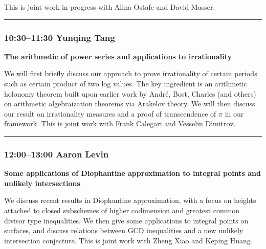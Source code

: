 \documentclass[11pt]{amsart}
\numberwithin{equation}{section}
\begin{document}
This is joint work in progress with Alina Ostafe and David Masser.

\bigskip
\hrule
\bigskip

\subsubsection*{10:30--11:30 \quad Yunqing Tang}

\textbf{The arithmetic of power series and applications to irrationality}

We will first briefly discuss our approach to prove irrationality of certain periods such as certain product of two log values. The key ingredient is an arithmetic holonomy theorem built upon earlier work by Andr\'e, Bost, Charles (and others) on arithmetic algebraization theorems via Arakelov theory. We will then discuss our result on irrationality measures and a proof of transcendence of $\pi$ in our framework. This is joint work with Frank Calegari and Vesselin Dimitrov.

\bigskip
\hrule
\bigskip

\subsubsection*{12:00--13:00 \quad Aaron Levin}


\textbf{Some applications of Diophantine approximation to integral points and unlikely intersections}

We discuss recent results in Diophantine approximation, with a focus on heights attached to closed subschemes of higher codimension and greatest common divisor type inequalities. We then give some applications to integral points on surfaces, and discuss relations between GCD inequalities and a new unlikely intersection conjecture. This is joint work with Zheng Xiao and Keping Huang.
\end{document}
